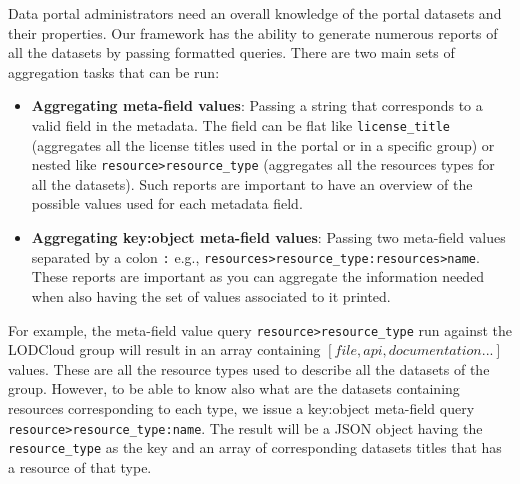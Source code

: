 \documentclass[runningheads,a4paper]{../../Util/LaTEX/llncs}
\begin{document}
Data portal administrators need an overall knowledge of the portal datasets and their properties. Our framework has the ability to generate numerous reports of all the datasets by passing formatted queries. There are two main sets of aggregation tasks that can be run:
\begin{itemize}
  \item \textbf{Aggregating meta-field values}: Passing a string that corresponds to a valid field in the metadata. The field can be flat like \texttt{license\_title} (aggregates all the license titles used in the portal or in a specific group) or nested like \texttt{resource>resource\_type} (aggregates all the resources types for all the datasets). Such reports are important to have an overview of the possible values used for each metadata field.
  \item \textbf{Aggregating key:object meta-field values}: Passing two meta-field values separated by a colon \texttt{:} e.g., \texttt{resources>resource\_type:resources>name}. These reports are important as you can aggregate the information needed when also having the set of values associated to it printed.
\end{itemize}

For example, the meta-field value query \texttt{resource>resource\_type} run against the LODCloud group will result in an array containing $[file,api,documentation ...]$ values. These are all the resource types used to describe all the datasets of the group. However, to be able to know also what are the datasets containing resources corresponding to each type, we issue a key:object meta-field query \texttt{resource>resource\_type:name}. The result will be a JSON object having the \texttt{resource\_type} as the key and an array of corresponding datasets titles that has a resource of that type.
\end{document}
